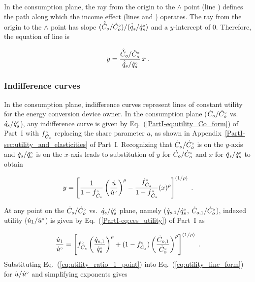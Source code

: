 In the consumption plane,
the ray from the origin to the $\wedge$ point 
(line \rr{})
defines the path along which the income effect
(lines \hatd{} and \dbar{})
operates.
The ray from the origin to the $\wedge$ point
has slope $(\hat{\dot{C}}_o/{}{\dot{C}}^{\scriptscriptstyle \circ}_o) / (\hat{\dot{q}}_s/{}{\dot{q}}^{\scriptscriptstyle \circ}_s)$
and a $y$-intercept of 0.
Therefore, the equation of line \rr{} is

\begin{equation} \label{eq:ray_cons}
  y = \frac{\hat{\dot{C}}_o/{}{\dot{C}}^{\scriptscriptstyle \circ}_o}{\hat{\dot{q}}_s/{}{\dot{q}}^{\scriptscriptstyle \circ}_s} \, x \; .
\end{equation}


\subsubsection{Indifference curves} 
\label{sec:cons_graph_indifference_curves}

In the consumption plane,
indifference curves represent lines of constant utility
for the energy conversion device owner.
In the consumption plane
($\dot{C}_o/{}{\dot{C}}^{\scriptscriptstyle \circ}_o$ vs.\ $\dot{q}_s/{}{\dot{q}}^{\scriptscriptstyle \circ}_s$), 
any indifference curve 
is given by 
Eq.~(\ref{PartI-eq:utility_Co_form}) of Part~I
with ${}{f}^{\scriptscriptstyle \circ}_{\dot{C}_s}$ replacing the share parameter $a$, 
as shown in Appendix~\ref{PartI-sec:utility_and_elasticities} of Part~I.
Recognizing that 
$\dot{C}_o/{}{\dot{C}}^{\scriptscriptstyle \circ}_o$ is on the $y$-axis and 
$\dot{q}_s/{}{\dot{q}}^{\scriptscriptstyle \circ}_s$ is on the $x$-axis
leads to substitution of 
$y$ for $\dot{C}_o/{}{\dot{C}}^{\scriptscriptstyle \circ}_o$ and 
$x$ for $\dot{q}_s/{}{\dot{q}}^{\scriptscriptstyle \circ}_s$ to obtain

\begin{equation} \label{eq:utility_line_form}
  y = \left[ \frac{1}{1 - {}{f}^{\scriptscriptstyle \circ}_{\dot{C}_s}} \left( \frac{\dot{u}}{{}{\dot{u}}^{\scriptscriptstyle \circ}} \right)^\rho 
            - \frac{{}{f}^{\scriptscriptstyle \circ}_{\dot{C}_s}}{1 - {}{f}^{\scriptscriptstyle \circ}_{\dot{C}_s}} (x)^\rho \right]^{(1/\rho)} \; .
\end{equation}

At any point on the 
$\dot{C}_o/{}{\dot{C}}^{\scriptscriptstyle \circ}_o$ vs.\ $\dot{q}_s/{}{\dot{q}}^{\scriptscriptstyle \circ}_s$ plane,
namely ($\dot{q}_{s,1}/{}{\dot{q}}^{\scriptscriptstyle \circ}_s$, $\dot{C}_{o,1}/{}{\dot{C}}^{\scriptscriptstyle \circ}_o$),
indexed utility ($\dot{u}_1/{}{\dot{u}}^{\scriptscriptstyle \circ}$) is given by Eq.~(\ref{PartI-eq:ces_utility}) of Part~I as

\begin{equation} \label{eq:utility_ratio_1_point}
  \frac{\dot{u}_1}{{}{\dot{u}}^{\scriptscriptstyle \circ}} =
        \left[ {}{f}^{\scriptscriptstyle \circ}_{\dot{C}_s} \left( \frac{\dot{q}_{s,1}}{{}{\dot{q}}^{\scriptscriptstyle \circ}_s} \right)^\rho
        + (1-{}{f}^{\scriptscriptstyle \circ}_{\dot{C}_s}) \left( \frac{\dot{C}_{o,1}}{{}{\dot{C}}^{\scriptscriptstyle \circ}_o} \right)^\rho  \right]^{(1/\rho)} \; .
\end{equation}
%
Substituting Eq.~(\ref{eq:utility_ratio_1_point}) into Eq.~(\ref{eq:utility_line_form})
for $\dot{u}/{}{\dot{u}}^{\scriptscriptstyle \circ}$
and simplifying exponents gives

